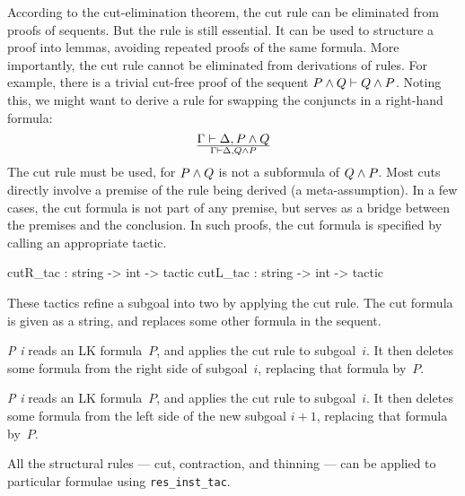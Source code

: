 According to the cut-elimination theorem, the cut rule can be eliminated
from proofs of sequents.  But the rule is still essential.  It can be used
to structure a proof into lemmas, avoiding repeated proofs of the same
formula.  More importantly, the cut rule cannot be eliminated from
derivations of rules.  For example, there is a trivial cut-free proof of
the sequent \(P\wedge Q\vdash Q\wedge P\).
Noting this, we might want to derive a rule for swapping the conjuncts
in a right-hand formula:
\[ \Gamma\vdash \Delta, P\wedge Q\over \Gamma\vdash \Delta, Q\wedge P \]
The cut rule must be used, for $P\wedge Q$ is not a subformula of $Q\wedge
P$.  Most cuts directly involve a premise of the rule being derived (a
meta-assumption).  In a few cases, the cut formula is not part of any
premise, but serves as a bridge between the premises and the conclusion.
In such proofs, the cut formula is specified by calling an appropriate
tactic.

\begin{ttbox} 
cutR_tac : string -> int -> tactic
cutL_tac : string -> int -> tactic
\end{ttbox}
These tactics refine a subgoal into two by applying the cut rule.  The cut
formula is given as a string, and replaces some other formula in the sequent.
\begin{ttdescription}
\item[\ttindexbold{cutR_tac} {\it P\/} {\it i}] reads an LK formula~$P$, and
  applies the cut rule to subgoal~$i$.  It then deletes some formula from the
  right side of subgoal~$i$, replacing that formula by~$P$.
  
\item[\ttindexbold{cutL_tac} {\it P\/} {\it i}] reads an LK formula~$P$, and
  applies the cut rule to subgoal~$i$.  It then deletes some formula from the
  left side of the new subgoal $i+1$, replacing that formula by~$P$.
\end{ttdescription}
All the structural rules --- cut, contraction, and thinning --- can be
applied to particular formulae using {\tt res_inst_tac}.


